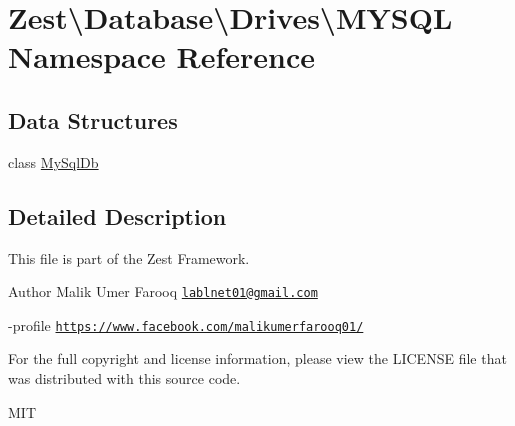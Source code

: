 \hypertarget{namespace_zest_1_1_database_1_1_drives_1_1_m_y_s_q_l}{}\section{Zest\textbackslash{}Database\textbackslash{}Drives\textbackslash{}M\+Y\+S\+QL Namespace Reference}
\label{namespace_zest_1_1_database_1_1_drives_1_1_m_y_s_q_l}
\subsection*{Data Structures}
\begin{DoxyCompactItemize}
\item 
class \mbox{\hyperlink{class_zest_1_1_database_1_1_drives_1_1_m_y_s_q_l_1_1_my_sql_db}{My\+Sql\+Db}}
\end{DoxyCompactItemize}


\subsection{Detailed Description}
This file is part of the Zest Framework.

\begin{DoxyAuthor}{Author}
Malik Umer Farooq \href{mailto:lablnet01@gmail.com}{\tt lablnet01@gmail.\+com} 

-\/profile \href{https://www.facebook.com/malikumerfarooq01/}{\tt https\+://www.\+facebook.\+com/malikumerfarooq01/}
\end{DoxyAuthor}
For the full copyright and license information, please view the L\+I\+C\+E\+N\+SE file that was distributed with this source code.

M\+IT 